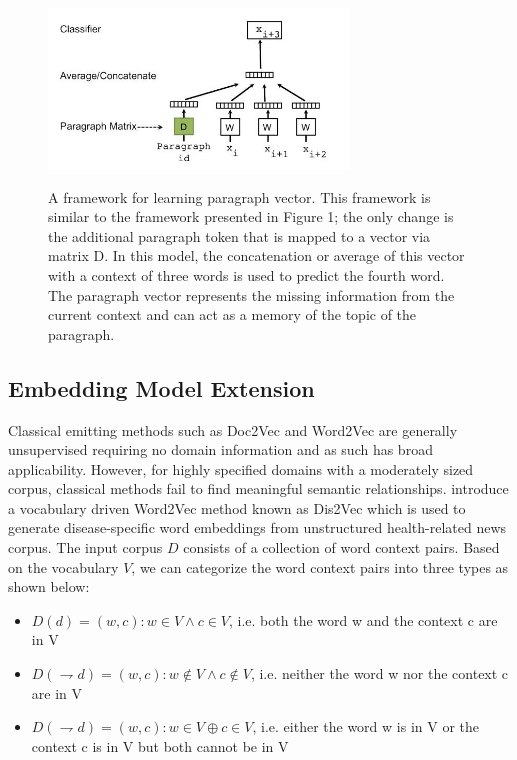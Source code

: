 \documentclass[12pt,a4paper] {article}
\begin{document}
	\begin{figure}[h]
	\centering
	\includegraphics[width=8cm, height=5cm]{para}
	\caption[]{A framework for learning paragraph vector. This framework
		is similar to the framework presented in Figure 1; the only
		change is the additional paragraph token that is mapped to a vector
		via matrix D. In this model, the concatenation or average of
		this vector with a context of three words is used to predict the
		fourth word. The paragraph vector represents the missing information
		from the current context and can act as a memory of the
		topic of the paragraph.}
	\label{fig:doc2vec model}
\end{figure}

\subsection*{Embedding Model Extension}

Classical emitting methods such as Doc2Vec and Word2Vec are generally unsupervised requiring no domain information and as such has broad
applicability. However, for highly specified domains with a moderately sized corpus, classical methods fail to find meaningful semantic relationships. 
\cite{ghosh2016characterizing} introduce a vocabulary driven Word2Vec method known as Dis2Vec which is used to generate disease-specific word embeddings from unstructured health-related news corpus. The input corpus $D$ consists of a collection of word context pairs. Based on the vocabulary $ V$, we can categorize the word context pairs into three types as shown
below:
\\
\begin{itemize}
	\item $ D(d) = {(w, c): w \in V ∧c \in V }$, i.e. both the word w and the context c are in V
	\item $D(\rightharpoondown d) = {(w, c): w \notin V ∧c \notin V }$, i.e. neither the word w nor the context c are in V
	\item $D(\rightharpoondown d) = {(w, c): w \in V \oplus c \in V }$, i.e. either the word w is in V or the context c is in V but both cannot be in V
\end{itemize}
\end{document}
